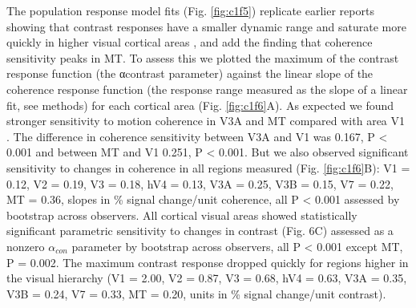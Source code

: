 \documentclass{report}
\begin{document}
The population response model fits (Fig. \ref{fig:c1f5}) replicate earlier reports showing that contrast responses have a smaller dynamic range and saturate more quickly in higher visual cortical areas \citep{Avidan2002-jg}, and add the finding that coherence sensitivity peaks in MT. To assess this we plotted the maximum of the contrast response function (the αcontrast parameter) against the linear slope of the coherence response function (the response range measured as the slope of a linear fit, see methods) for each cortical area (Fig. \ref{fig:c1f6}A). As expected we found stronger sensitivity to motion coherence in V3A and MT compared with area V1 \citep{Dupont1994-yi,Tootell1998-mr,Watson1993-th,Zeki1991-zf}. The difference in coherence sensitivity between V3A and V1 was 0.167, P < 0.001 and between MT and V1 0.251, P < 0.001. But we also observed significant sensitivity to changes in coherence in all regions measured (Fig. \ref{fig:c1f6}B): V1 = 0.12, V2 = 0.19, V3 = 0.18, hV4 = 0.13, V3A = 0.25, V3B = 0.15, V7 = 0.22, MT = 0.36, slopes in \% signal change/unit coherence, all P < 0.001 assessed by bootstrap across observers. All cortical visual areas showed statistically significant parametric sensitivity to changes in contrast (Fig. 6C) assessed as a nonzero $\alpha_{con}$ parameter by bootstrap across observers, all P < 0.001 except MT, P = 0.002. The maximum contrast response dropped quickly for regions higher in the visual hierarchy (V1 = 2.00, V2 = 0.87, V3 = 0.68, hV4 = 0.63, V3A = 0.35, V3B = 0.24, V7 = 0.33, MT = 0.20, units in \% signal change/unit contrast).
\end{document}
